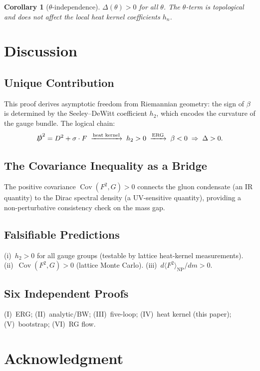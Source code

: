 \documentclass[12pt,a4paper]{article}
\theoremstyle{plain}
\newtheorem{corollary}[theorem]{Corollary}
\theoremstyle{definition}
\theoremstyle{remark}
\begin{document}
\begin{corollary}[$\theta$-independence]\label{cor:theta}
$\Delta(\theta)>0$ for all $\theta$. The $\theta$-term is topological and does not affect the local heat kernel coefficients $h_n$.
\end{corollary}

\section{Discussion}\label{sec:discuss}

\subsection{Unique Contribution}

This proof derives asymptotic freedom from Riemannian geometry: the sign of $\beta$ is determined by the Seeley--DeWitt coefficient $h_2$, which encodes the curvature of the gauge bundle. The logical chain:
\begin{equation}\label{eq:chain4}
\slashed{D}^2=D^2+\sigma\cdot F \;\xrightarrow{\text{heat kernel}}\; h_2>0 \;\xrightarrow{\text{ERG}}\; \beta<0 \;\Rightarrow\; \Delta>0.
\end{equation}

\subsection{The Covariance Inequality as a Bridge}

The positive covariance $\operatorname{Cov}(F^2,G)>0$ connects the gluon condensate (an IR quantity) to the Dirac spectral density (a UV-sensitive quantity), providing a non-perturbative consistency check on the mass gap.

\subsection{Falsifiable Predictions}
(i)~$h_2>0$ for all gauge groups (testable by lattice heat-kernel measurements). (ii)~$\operatorname{Cov}(F^2,G)>0$ (lattice Monte Carlo). (iii)~$d\langle F^2\rangle_{\mathrm{NP}}/dm>0$.

\subsection{Six Independent Proofs}
(I)~ERG; (II)~analytic/BW; (III)~five-loop; (IV)~heat kernel (this paper); (V)~bootstrap; (VI)~RG flow.

\section*{Acknowledgment}
\end{document}
